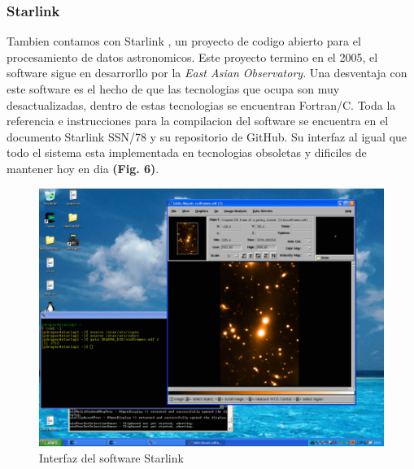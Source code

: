 \documentclass[9pt,twocolumn,a4paper]{opticajnl}
\begin{document}
\subsubsection*{Starlink}
Tambien contamos con Starlink \cite{Berry_Starlink}, un proyecto de codigo abierto para el procesamiento de datos astronomicos. Este proyecto termino en el 2005, el software sigue en desarrorllo por la \textit{East Asian Observatory}. Una desventaja con este software es el hecho de que las tecnologias que ocupa son muy desactualizadas, dentro de estas tecnologias se encuentran Fortran/C. Toda la referencia e instrucciones para la compilacion del software se encuentra en el documento Starlink SSN/78 y su repositorio de GitHub. Su interfaz al igual que todo el sistema esta implementada en tecnologias obsoletas y dificiles de mantener hoy en dia \textbf{(Fig. 6)}.
\begin{figure}
	\centering
	\includegraphics[width=0.8\linewidth]{starlinkcap}
	\caption{Interfaz del software Starlink}
	\label{fig:starlinkcap}
\end{figure}
\end{document}
